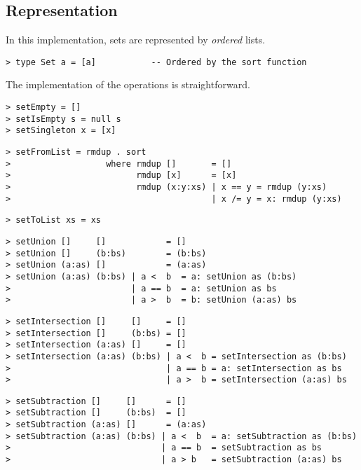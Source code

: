 \subsection{Representation}

In this implementation, sets are represented by {\em ordered\/} lists.
\begin{verbatim}
> type Set a = [a]           -- Ordered by the sort function
\end{verbatim}
%
The implementation of the operations is straightforward.
\begin{verbatim}
> setEmpty = []
> setIsEmpty s = null s
> setSingleton x = [x]
\end{verbatim}
%
%
%
\begin{verbatim}
> setFromList = rmdup . sort
>                   where rmdup []       = []
>                         rmdup [x]      = [x]
>                         rmdup (x:y:xs) | x == y = rmdup (y:xs)
>                                        | x /= y = x: rmdup (y:xs)
\end{verbatim}
%
\begin{verbatim}
> setToList xs = xs
\end{verbatim}
%
\begin{verbatim}
> setUnion []     []            = []
> setUnion []     (b:bs)        = (b:bs)
> setUnion (a:as) []            = (a:as)
> setUnion (a:as) (b:bs) | a <  b  = a: setUnion as (b:bs)
>                        | a == b  = a: setUnion as bs
>                        | a >  b  = b: setUnion (a:as) bs
\end{verbatim}
%
%
%
%
\begin{verbatim}
> setIntersection []     []     = []
> setIntersection []     (b:bs) = []
> setIntersection (a:as) []     = []
> setIntersection (a:as) (b:bs) | a <  b = setIntersection as (b:bs)
>                               | a == b = a: setIntersection as bs
>                               | a >  b = setIntersection (a:as) bs
\end{verbatim}
%
%
%
%
\begin{verbatim}
> setSubtraction []     []      = []
> setSubtraction []     (b:bs)  = []
> setSubtraction (a:as) []      = (a:as)
> setSubtraction (a:as) (b:bs) | a <  b  = a: setSubtraction as (b:bs)
>                              | a == b  = setSubtraction as bs
>                              | a > b   = setSubtraction (a:as) bs
\end{verbatim}
